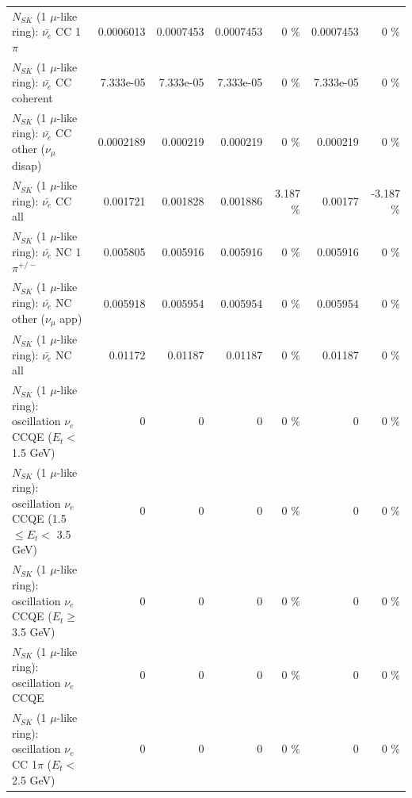 \begin{table}
\begin{tabular}{| l | r | r | r  r | r  r |}
\hline
                           $N_{SK}$ (1 $\mu$-like ring): $\bar{\nu_e}$ CC 1$\pi$ &       0.0006013 &       0.0007453 &       0.0007453 &        0 \%  &       0.0007453 &        0 \%  \\ 
                         $N_{SK}$ (1 $\mu$-like ring): $\bar{\nu_e}$ CC coherent &       7.333e-05 &       7.333e-05 &       7.333e-05 &        0 \%  &       7.333e-05 &        0 \%  \\ 
          $N_{SK}$ (1 $\mu$-like ring): $\bar{\nu_e}$ CC other ($\nu_\mu$ disap) &       0.0002189 &        0.000219 &        0.000219 &        0 \%  &        0.000219 &        0 \%  \\ 
                            $N_{SK}$ (1 $\mu$-like ring): $\bar{\nu_{e}}$ CC all &        0.001721 &        0.001828 &        0.001886 &    3.187 \%  &         0.00177 &   -3.187 \%  \\ 
\hline
                     $N_{SK}$ (1 $\mu$-like ring): $\bar{\nu_e}$ NC 1$\pi^{+/-}$ &        0.005805 &        0.005916 &        0.005916 &        0 \%  &        0.005916 &        0 \%  \\ 
            $N_{SK}$ (1 $\mu$-like ring): $\bar{\nu_e}$ NC other ($\nu_\mu$ app) &        0.005918 &        0.005954 &        0.005954 &        0 \%  &        0.005954 &        0 \%  \\ 
                            $N_{SK}$ (1 $\mu$-like ring): $\bar{\nu_{e}}$ NC all &         0.01172 &         0.01187 &         0.01187 &        0 \%  &         0.01187 &        0 \%  \\ 
\hline
\hline
\hline
      $N_{SK}$ (1 $\mu$-like ring): oscillation $\nu_e$ CCQE ($E_{t} <$ 1.5 GeV) &               0 &               0 &               0 &        0 \%  &               0 &        0 \%  \\ 
$N_{SK}$ (1 $\mu$-like ring): oscillation $\nu_e$ CCQE (1.5 $\leq E_{t} <$ 3.5 GeV) &               0 &               0 &               0 &        0 \%  &               0 &        0 \%  \\ 
   $N_{SK}$ (1 $\mu$-like ring): oscillation $\nu_e$ CCQE ($E_{t} \geq$ 3.5 GeV) &               0 &               0 &               0 &        0 \%  &               0 &        0 \%  \\ 
\hline
                          $N_{SK}$ (1 $\mu$-like ring): oscillation $\nu_e$ CCQE &               0 &               0 &               0 &        0 \%  &               0 &        0 \%  \\ 
\hline
 $N_{SK}$ (1 $\mu$-like ring): oscillation $\nu_e$ CC 1$\pi$ ($E_{t} <$ 2.5 GeV) &               0 &               0 &               0 &        0 \%  &               0 &        0 \%  \\ 

\end{tabular}
\end{table}
